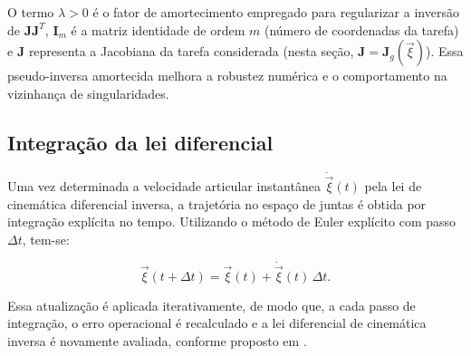 O termo $\lambda>0$ é o fator de amortecimento empregado para regularizar a inversão de $\mathbf{J}\mathbf{J}^{T}$, $\mathbf{I}_{m}$ é a matriz identidade de ordem $m$ (número de coordenadas da tarefa) e $\mathbf{J}$ representa a Jacobiana da tarefa considerada (nesta seção, $\mathbf{J}=\mathbf{J}_{g}(\vec{\xi})$).
Essa pseudo-inversa amortecida melhora a robustez numérica e o comportamento na vizinhança de singularidades.


\subsection{Integração da lei diferencial}

Uma vez determinada a velocidade articular instantânea $\dot{\vec{\xi}}(t)$ pela lei de cinemática diferencial inversa, a trajetória no espaço de juntas é obtida por integração explícita no tempo.
Utilizando o método de Euler explícito com passo $\Delta t$, tem-se:

\begin{equation}
\label{eq_integracao_explicita_xi}
\vec{\xi}(t + \Delta t)
=
\vec{\xi}(t)
+
\dot{\vec{\xi}}(t)\,\Delta t.
\end{equation}

Essa atualização é aplicada iterativamente, de modo que, a cada passo de integração, o erro operacional é recalculado e a lei diferencial de cinemática inversa é novamente avaliada, conforme proposto em \cite{sciavicco_siciliano2010}.
